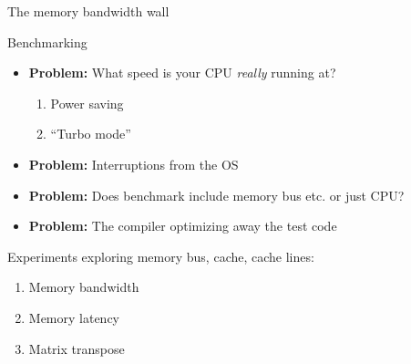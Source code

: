 \documentclass[sans,mathserif]{beamer}
\begin{document}
\begin{frame}
  
  \begin{center}
    \Large The memory bandwidth wall
  \end{center}
\end{frame}

\begin{frame}{Benchmarking}

\begin{itemize}
\item<+-> {\bf Problem:} What speed is your CPU {\em really} running at?
  \begin{enumerate}
  \item Power saving
  \item ``Turbo mode''
  \end{enumerate}
\vspace{0.2cm}
\vspace{0.5cm}

\item<+-> {\bf Problem:} Interruptions from the OS\\
\vspace{0.2cm}
\vspace{0.5cm}

\item<+-> {\bf Problem:} Does benchmark include memory bus etc. or just CPU? \\
\vspace{0.5cm}

\item<+-> {\bf Problem:} The compiler optimizing away the test code

\end{itemize}

\end{frame}

\begin{frame}
Experiments exploring memory bus, cache, cache lines:
\begin{enumerate}
\item<+-> Memory bandwidth
\item<+-> Memory latency
\item<+-> Matrix transpose
\end{enumerate}
\end{frame}
\end{document}
